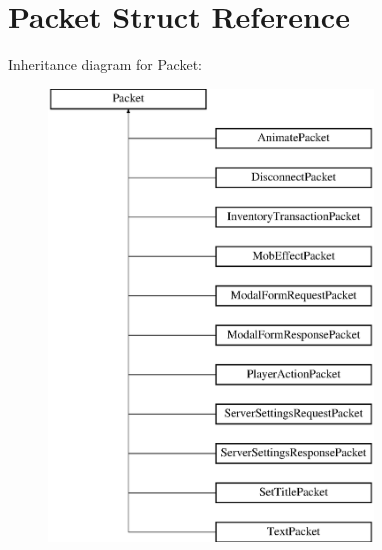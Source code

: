 \hypertarget{struct_packet}{}\section{Packet Struct Reference}
\label{struct_packet}
Inheritance diagram for Packet\+:\begin{figure}[H]
\begin{center}
\leavevmode
\includegraphics[height=12.000000cm]{struct_packet}
\end{center}
\end{figure}

